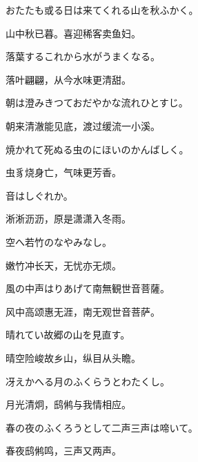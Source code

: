 \begin{haiku}
    {\FH おたたも或る日は来てくれる山を秋ふかく。}

    {\FK 山中秋已暮。喜迎稀客卖鱼妇。}
\end{haiku}

\begin{haiku}
    {\FH 落葉するこれから水がうまくなる。}

    {\FK 落叶翩翩，从今水味更清甜。}
\end{haiku}

\begin{haiku}
    {\FH 朝は澄みきつておだやかな流れひとすじ。}

    {\FK 朝来清澈能见底，渡过缓流一小溪。}
\end{haiku}

\begin{haiku}
    {\FH 焼かれて死ぬる虫のにほいのかんばしく。}

    {\FK 虫豸烧身亡，气味更芳香。}
\end{haiku}

\begin{haiku}
    {\FH 音はしぐれか。}

    {\FK 淅淅沥沥，原是潇潇入冬雨。}
\end{haiku}

\begin{haiku}
    {\FH 空へ若竹のなやみなし。}

    {\FK 嫩竹冲长天，无忧亦无烦。}
\end{haiku}

\begin{haiku}
    {\FH 風の中声はりあげて南無観世音菩薩。}

    {\FK 风中高颂惠无涯，南无观世音菩萨。}
\end{haiku}

\begin{haiku}
    {\FH 晴れてい故郷の山を見直す。}

    {\FK 晴空险峻故乡山，纵目从头瞻。}
\end{haiku}

\begin{haiku}
    {\FH 冴えかへる月のふくらうとわたくし。}

    {\FK 月光清炯，鸱鸺与我情相应。}
\end{haiku}

\begin{haiku}
    {\FH 春の夜のふくろうとして二声三声は啼いて。}

    {\FK 春夜鸱鸺鸣，三声又两声。}
\end{haiku}

